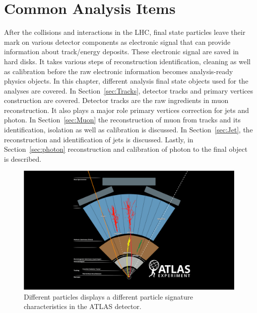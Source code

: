 \chapter{Common Analysis Items}
\label{chapter:CommonAnalysisItems}

After the collisions and interactions in the LHC, final state particles leave their mark on various detector components as electronic signal that can provide information about track/energy deposits. These electronic signal are saved in hard disks. It takes various steps of reconstruction identification, cleaning as well as calibration before the raw electronic information becomes analysis-ready physics objects. 
In this chapter, different analysis final state objects used for the analyses are covered. In Section~\ref{sec:Tracks}, detector tracks and primary vertices construction are covered. Detector tracks are the raw ingredients in muon reconstruction. It also plays a major role primary vertices correction for jets and photon. In Section~\ref{sec:Muon} the reconstruction of muon from tracks and its identification, isolation as well as calibration is discussed. In Section~\ref{sec:Jet}, the reconstruction and identification
of jets is discussed. Lastly, in Section~\ref{sec:photon} reconstruction and calibration of photon to the final object is described.

\begin{figure}[!htb]
    \begin{center}
        \includegraphics[width=1.1\textwidth]{figures/common_ana/ParticleSignature}
        \caption{        
            Different particles displays a different particle signature characteristics in the ATLAS detector\cite{Mehlhase:2770815}.
        }
        \label{fig:isolationWP}
    \end{center}
\end{figure}

